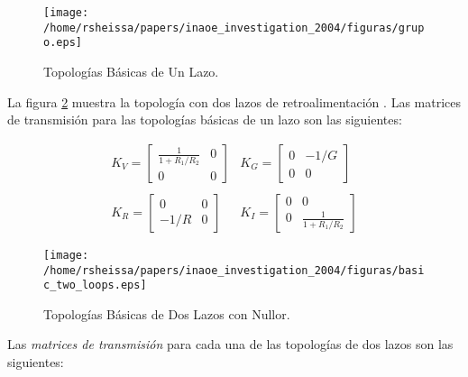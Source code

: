 \documentclass[10pt,twocolumn,twoside,letterpaper]{IEEEtran}
\begin{document}
{\begin{figure}[hbtp]
   \centering
   \texttt{[image: /home/rsheissa/papers/inaoe\_investigation\_2004/figuras/grupo.eps]}
   \caption{Topolog\'ias B\'asicas de Un Lazo.}
   \label{fig:basic_topologies}
\end{figure}

La figura \ref{fig:basic_two_loops} muestra la topolog\'ia con dos lazos de retroalimentaci\'on \cite{stoffels}. Las matrices de transmisi\'on para las topolog\'ias b\'asicas de un lazo son las siguientes:

\begin{scriptsize}\begin{equation}
\begin{array}{ll}
{K_{V}=
\left[\begin{array}{cc}
{\frac{1}{1+R_1/R_2}}&0\\
0&0
\end{array} \right]}&
{K_{G}=
\left[\begin{array}{cc}
0&{-1/G}\\
0&0
\end{array} \right]}\\
\\
{K_{R}=
\left[\begin{array}{cc}
0&0\\
{-1/R}&0
\end{array} \right]}&
{K_{I}=
\left[\begin{array}{cc}
0&0\\
0&{\frac{1}{1+R_1/R_2}}
\end{array} \right]}
\end{array}
\label{eq:chain_matrix}
\end{equation}\end{scriptsize}

\begin{figure}
   \centering
   \texttt{[image: /home/rsheissa/papers/inaoe\_investigation\_2004/figuras/basic\_two\_loops.eps]}
   \caption{Topolog\'ias B\'asicas de Dos Lazos con {\mbox Nullor}.}
   \label{fig:basic_two_loops}
\end{figure}

Las {\it matrices de transmisi\'on} para cada una de las topolog\'ias de dos lazos son las siguientes:

}
\end{document}
